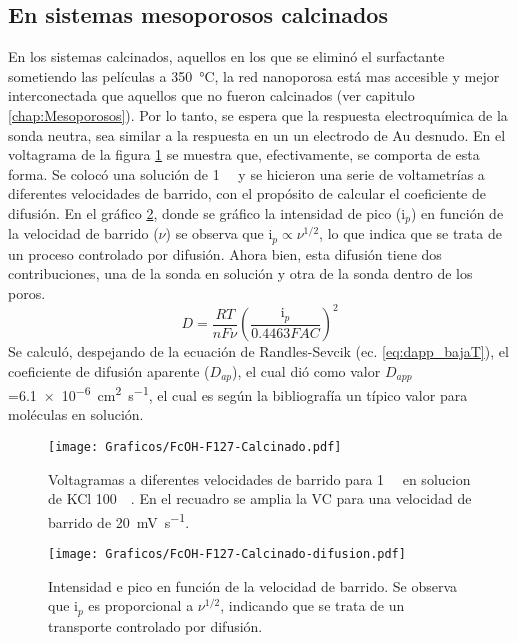 	\subsection{En sistemas mesoporosos calcinados}

	 En los sistemas calcinados, aquellos en los que se eliminó el surfactante sometiendo las películas a \SI{350}{\celsius}, la red nanoporosa está mas accesible y mejor interconectada que aquellos que no fueron calcinados (ver capitulo \ref{chap:Mesoporosos}). Por lo tanto, se espera que la respuesta electroquímica de la sonda neutra, sea similar a la respuesta en un un electrodo de Au desnudo. En el voltagrama de la figura \ref{fig:fc_calcinado} se muestra que, efectivamente, se comporta de esta forma. Se colocó una solución de \fc\space \SI{1}{\milli\Molar} y se hicieron una serie de voltametrías a diferentes velocidades de barrido, con el propósito de calcular el coeficiente de difusión. En el gráfico \ref{fig:difusion_calcinado}, donde se gráfico la intensidad de pico (i$_p$) en función de la velocidad de barrido ($\nu$) se observa que $\text{i}_p \propto \nu^{1/2}$, lo que indica que se trata de un proceso controlado por difusión. Ahora bien, esta difusión tiene dos contribuciones, una de la sonda en solución y otra de la sonda dentro de los poros. 
		 \begin{equation}
					D=\frac{RT}{nF\nu}\left(\frac{\text{i}_p}{0.4463FAC}\right)^2
					\label{eq:dapp_bajaT}
			\end{equation}  
	 Se calculó, despejando de la ecuación de Randles-Sevcik (ec. \ref{eq:dapp_bajaT}), el coeficiente de difusión aparente ($D_{ap}$), el cual dió como valor $D_{app}$=\SI{6,1e-6}{\square\cm\per\second}, el cual es según la bibliografía un típico valor para moléculas en solución. \cite{koryta1993,Otal2006}

			\begin{figure}[ht]
				\centering
		 	    \texttt{[image: Graficos/FcOH-F127-Calcinado.pdf]}
		        \caption[Voltagrama para \fc\space en \pdm\space calcinadas]{Voltagramas a diferentes velocidades de barrido para \fc\space \SI{1}{\milli\Molar} en solucion de KCl \SI{100}{\milli\Molar}. En el recuadro se amplia la VC para una velocidad de barrido de \SI{20}{\milli\volt\per\second}.}
		        \label{fig:fc_calcinado}
		      	\end{figure}

		    \begin{figure}[ht]
				\centering
		 	    \texttt{[image: Graficos/FcOH-F127-Calcinado-difusion.pdf]}
		        \caption[i$_p$ en función de $\nu$ para \fc\space]{Intensidad e pico en función de la velocidad de barrido. Se observa que $\text{i}_p$ es proporcional a $\nu ^{1/2}$, indicando que se trata de un transporte controlado por difusión.}
		        \label{fig:difusion_calcinado}
		      	\end{figure}
	      	
